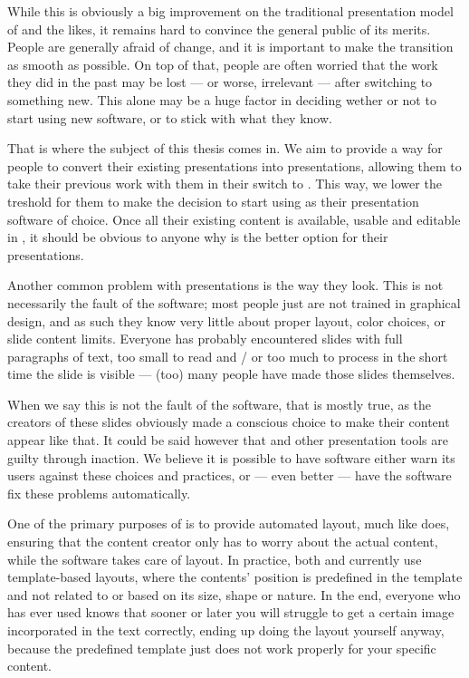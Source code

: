   While this is obviously a big improvement on the traditional presentation
  model of \ppt* and the likes, it remains hard to convince the general public
  of its merits. People are generally afraid of change, and it is important to
  make the transition as smooth as possible. On top of that, people are often
  worried that the work they did in the past may be lost --- or worse,
  irrelevant --- after switching to something new. This alone may be a huge
  factor in deciding wether or not to start using new software, or to stick
  with what they know.

  That is where the subject of this thesis comes in. We aim to provide a way
  for people to convert their existing \ppt presentations into \mxp
  presentations, allowing them to take their previous work with them in their
  switch to \mxp. This way, we lower the treshold for them to make the decision
  to start using \mxp as their presentation software of choice. Once all their
  existing \ppt content is available, usable and editable in \mxp, it should be
  obvious to anyone why \mxp is the better option for their presentations.

  Another common problem with \ppt presentations is the way they look. This is
  not necessarily the fault of the software; most people just are not trained
  in graphical design, and as such they know very little about proper layout,
  color choices, or slide content limits. Everyone has probably encountered
  slides with full paragraphs of text, too small to read and / or too much to
  process in the short time the slide is visible --- (too) many people have
  made those slides themselves.

  When we say this is not the fault of the software, that is mostly true, as
  the creators of these slides obviously made a conscious choice to make their
  content appear like that. It could be said however that \ppt* and other
  presentation tools are guilty through inaction. We believe it is possible to
  have software either warn its users against these choices and practices, or
  --- even better --- have the software fix these problems automatically.

  One of the primary purposes of \mxp is to provide automated layout, much like
  \latex does, ensuring that the content creator only has to worry about the
  actual content, while the software takes care of layout. In practice, both
  \latex and \mxp currently use template-based layouts, where the contents'
  position is predefined in the template and not related to or based on its
  size, shape or nature. In the end, everyone who has ever used \latex knows
  that sooner or later you will struggle to get a certain image incorporated in
  the text correctly, ending up doing the layout yourself anyway, because the
  predefined template just does not work properly for your specific content.

